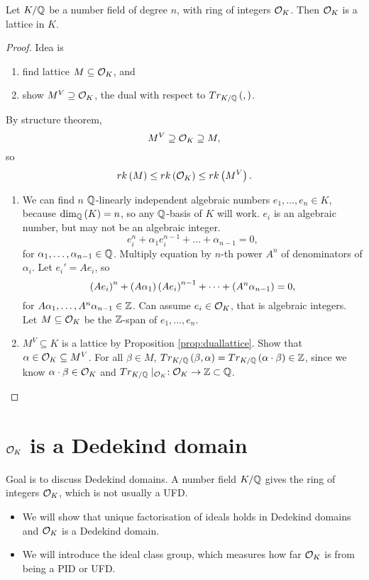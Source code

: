 \begin{theorem}
Let $ K / \mathbb{Q} $ be a number field of degree $ n $, with ring of integers $ \mathcal{O}_K $. Then $ \mathcal{O}_K $ is a lattice in $ K $.
\end{theorem}

\begin{proof}
Idea is
\begin{enumerate}
\item find lattice $ M \subseteq \mathcal{O}_K $, and
\item show $ M^V \supseteq \mathcal{O}_K $, the dual with respect to $ Tr_{K / \mathbb{Q}}\left( , \right) $.
\end{enumerate}
By structure theorem,
$$ M^V \supseteq \mathcal{O}_K \supseteq M, $$
so
$$ rk\left( M \right) \le rk\left( \mathcal{O}_K \right) \le rk\left( M^V \right). $$
\begin{enumerate}
\item We can find $ n $ $ \mathbb{Q} $-linearly independent algebraic numbers $ e_1, \dots, e_n \in K $, because $ \dim_{\mathbb{Q}}\left( K \right) = n $, so any $ \mathbb{Q} $-basis of $ K $ will work. $ e_i $ is an algebraic number, but may not be an algebraic integer.
$$ e_i^n + \alpha_1e_i^{n - 1} + \dots + \alpha_{n - 1} = 0, $$
for $ \alpha_1, \dots, \alpha_{n - 1} \in \mathbb{Q} $. Multiply equation by $ n $-th power $ A^n $ of denominators of $ \alpha_i $. Let $ e_i' = Ae_i $, so
$$ \left( Ae_i \right)^n + \left( A\alpha_1 \right)\left( Ae_i \right)^{n - 1} + \dots + \left( A^n\alpha_{n - 1} \right) = 0, $$
for $ A\alpha_1, \dots, A^n\alpha_{n - 1} \in \mathbb{Z} $. Can assume $ e_i \in \mathcal{O}_K $, that is algebraic integers. Let $ M \subseteq \mathcal{O}_K $ be the $ \mathbb{Z} $-span of $ e_1, \dots, e_n $.
\item $ M^V \subseteq K $ is a lattice by Proposition \ref{prop:duallattice}. Show that $ \alpha \in \mathcal{O}_K \subseteq M^V $. For all $ \beta \in M $, $ Tr_{K / \mathbb{Q}}\left( \beta, \alpha \right) = Tr_{K / \mathbb{Q}}\left( \alpha \cdot \beta \right) \in \mathbb{Z} $, since we know $ \alpha \cdot \beta \in \mathcal{O}_K $ and $ Tr_{K / \mathbb{Q}} \mid_{\mathcal{O}_K} : \mathcal{O}_K \to \mathbb{Z} \subset \mathbb{Q} $.
\end{enumerate}
\end{proof}

\pagebreak

\section{$ \mathcal{O}_K $ is a Dedekind domain}


Goal is to discuss Dedekind domains. A number field $ K / \mathbb{Q} $ gives the ring of integers $ \mathcal{O}_K $, which is not usually a UFD.
\begin{itemize}
\item We will show that unique factorisation of ideals holds in Dedekind domains and $ \mathcal{O}_K $ is a Dedekind domain.
\item We will introduce the ideal class group, which measures how far $ \mathcal{O}_K $ is from being a PID or UFD.
\end{itemize}

